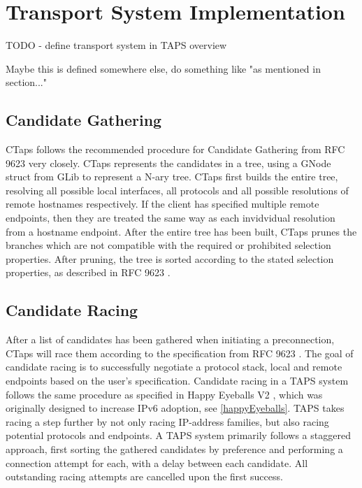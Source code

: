\chapter{Transport System Implementation}  \label{transportSystemImpl}

TODO - define transport system in TAPS overview

Maybe this is defined somewhere else, do something like "as mentioned in section..."

\section{Candidate Gathering} \label{sec:candidateGathering}
CTaps follows the recommended procedure for Candidate Gathering from RFC 9623
very closely. CTaps represents the candidates in a tree, using a GNode struct from
GLib to represent a N-ary tree. CTaps first builds the entire tree, resolving
all possible local interfaces, all protocols and all possible resolutions of
remote hostnames respectively. If the client has specified multiple remote endpoints,
then they are treated the same way as each invidvidual resolution from a hostname
endpoint. After the entire tree has been built, CTaps prunes the branches which
are not compatible with the required or prohibited selection properties. After pruning,
the tree is sorted according to the stated selection properties, as described in RFC 9623 
\cite{brunstromImplementingInterfacesTransport2025}.

\section{Candidate Racing} \label{sec:candidateRacing}
After a list of candidates has been gathered when initiating a preconnection, CTaps
will race them according to the specification from RFC 9623 \cite{brunstromImplementingInterfacesTransport2025}.
The goal of candidate racing is to successfully negotiate a protocol stack, local
and remote endpoints based on the user's specification. Candidate racing in a TAPS
system follows the same procedure as specified in Happy Eyeballs V2 \cite{schinaziHappyEyeballsVersion2017},
which was originally designed to increase IPv6 adoption, see \cref{happyEyeballs}.
TAPS takes racing a step further by not only racing IP-address families, but also
racing potential protocols and endpoints. A TAPS system primarily follows a staggered
approach, first sorting the gathered candidates by preference and performing a connection
attempt for each, with a delay between each candidate. All outstanding racing attempts
are cancelled upon the first success.

